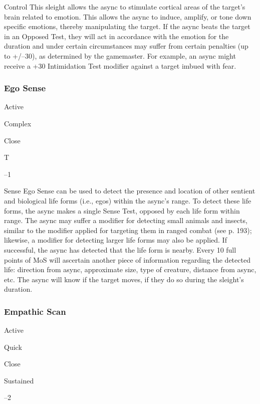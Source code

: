   

Control
This sleight allows the async to stimulate cortical areas 
of the target's brain related to emotion. This allows 
the async to induce, amplify, or tone down specific 
emotions, thereby manipulating the target. If the async 
beats the target in an Opposed Test, they will act in accordance
with the emotion for the duration and under
certain circumstances may suffer from certain penalties 
(up to +/–30), as determined by the gamemaster. For 
example, an async might receive a +30 Intimidation 
Test modifier against a target imbued with fear.

\subsubsection{Ego Sense}


  

Active

   Complex

 Close

   T

   –1

  

Sense
Ego Sense can be used to detect the presence and 
location of other sentient and biological life forms 
(i.e., egos) within the async's range. To detect these 
life forms, the async makes a single Sense Test, opposed
by each life form within range. The async may
suffer a modifier for detecting small animals and 
insects, similar to the modifier applied for targeting
them in ranged combat (see p. 193); likewise, a
modifier for detecting larger life forms may also be 
applied. If successful, the async has detected that the 
life form is nearby. Every 10 full points of MoS will 
ascertain another piece of information regarding the 
detected life: direction from async, approximate size, 
type of creature, distance from async, etc. The async 
will know if the target moves, if they do so during the 
sleight's duration.

\subsubsection{Empathic Scan}


  

Active

   Quick

 Close

   Sustained

   –2

  

